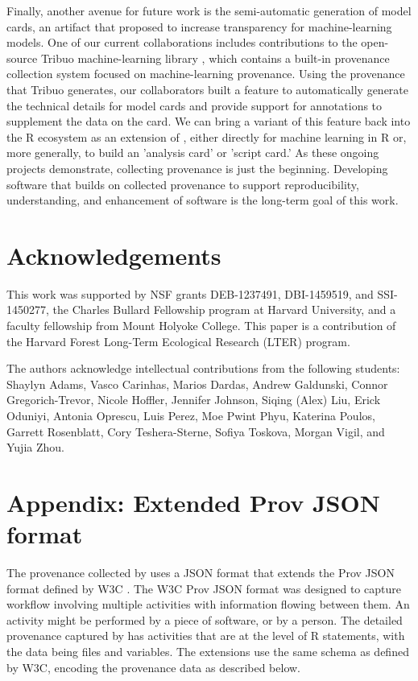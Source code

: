 Finally, another avenue for future work is the semi-automatic generation of model cards, an artifact that \citet{mitchell2019model} proposed to increase transparency for machine-learning models. One of our current collaborations includes contributions to the open-source Tribuo machine-learning library \citep{pocock2021tribuo}, which contains a built-in provenance collection system focused on machine-learning provenance. Using the provenance that Tribuo generates, our collaborators built a feature to automatically generate the technical details for model cards and provide support for annotations to supplement the data on the card. We can bring a variant of this feature back into the R ecosystem as an extension of , either directly for machine learning in R or, more generally, to build an 'analysis card' or 'script card.' 
As these ongoing projects demonstrate, collecting provenance is just the beginning.  Developing software that builds on collected provenance to support reproducibility, understanding, and enhancement of software is the long-term goal of this work.

\section*{Acknowledgements}
This work was supported by NSF grants DEB-1237491, DBI-1459519, and SSI-1450277, the Charles Bullard Fellowship program at Harvard University, and a faculty fellowship from Mount Holyoke College. This paper is a contribution of the Harvard Forest Long-Term Ecological Research (LTER) program.

The authors acknowledge intellectual contributions from the following students: Shaylyn Adams, Vasco Carinhas, Marios Dardas, Andrew Galdunski, Connor Gregorich-Trevor, Nicole Hoffler, Jennifer Johnson, Siqing (Alex) Liu, Erick Oduniyi, Antonia Oprescu, Luis Perez, Moe Pwint Phyu, Katerina Poulos, Garrett Rosenblatt, Cory Teshera-Sterne, Sofiya Toskova, Morgan Vigil, and Yujia Zhou.

\appendix

\section{Appendix: Extended Prov JSON format}
\label{sec:ExtendedJSON}
The provenance collected by  uses a JSON format that extends the Prov JSON format defined by W3C \cite{provjson}.  The W3C Prov JSON format was designed to capture workflow involving multiple activities with information flowing between them.  An activity might be performed by a piece of software, or by a person.  The detailed provenance captured by  has activities that are at the level of R statements, with the data being files and variables.
The extensions use the same schema as defined by W3C, encoding the provenance data as described below.

